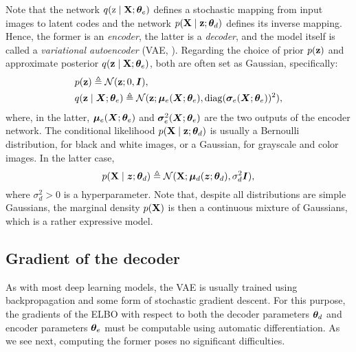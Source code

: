 Note that the network $q({\textnormal{z}} \mid {\mathbf{X}}; {\bm{\theta}}_e)$ defines a stochastic mapping from input images to latent codes and the network $p({\mathbf{X}} \mid {\mathbf{z}}; {\bm{\theta}}_d)$ defines its inverse mapping. Hence, the former is an \emph{encoder}, the latter is a \emph{decoder}, and the model itself is called a \emph{variational autoencoder} (VAE, \citet{Kingma2013}). Regarding the choice of prior $p({\mathbf{z}})$ and approximate posterior $q({\mathbf{z}} \mid {\mathbf{X}}; {\bm{\theta}}_e)$, both are often set as Gaussian, specifically:
\begin{align}
    &p({\mathbf{z}}) \triangleq \mathcal{N}({\mathbf{z}}; 0, {\bm{I}}), \\
    &q({\mathbf{z}} \mid {\bm{X}}; {\bm{\theta}}_e) \triangleq \mathcal{N}({\mathbf{z}}; {\bm{\mu}}_e({\bm{X}}; {\bm{\theta}}_e), \mathrm{diag}({\bm{\sigma}}_e({\bm{X}}; {\bm{\theta}}_e))^2),
\end{align}
where, in the latter, ${\bm{\mu}}_e({\bm{X}}; {\bm{\theta}}_e)$ and ${\bm{\sigma}}_e^2({\bm{X}}; {\bm{\theta}}_e)$ are the two outputs of the encoder network. The conditional likelihood $p({\mathbf{X}} \mid {\mathbf{z}}; {\bm{\theta}}_d)$ is usually a Bernoulli distribution, for black and white images, or a Gaussian, for grayscale and color images. In the latter case,
\begin{equation}
    \label{eq:gaussian_vae}
    p({\mathbf{X}} \mid {\bm{z}}; {\bm{\theta}}_d) \triangleq \mathcal{N}({\mathbf{X}}; {\bm{\mu}}_d({\bm{z}}; {\bm{\theta}}_d), \sigma_d^2 {\bm{I}}),
\end{equation}
where $\sigma_d^2 > 0$ is a hyperparameter. Note that, despite all distributions are simple Gaussians, the marginal density $p({\mathbf{X}})$ is then a continuous mixture of Gaussians, which is a rather expressive model.

\subsection{Gradient of the decoder}
As with most deep learning models, the VAE is usually trained using backpropagation and some form of stochastic gradient descent. For this purpose, the gradients of the ELBO with respect to both the decoder parameters ${\bm{\theta}}_d$ and encoder parameters ${\bm{\theta}}_e$ must be computable using automatic differentiation. As we see next, computing the former poses no significant difficulties.

